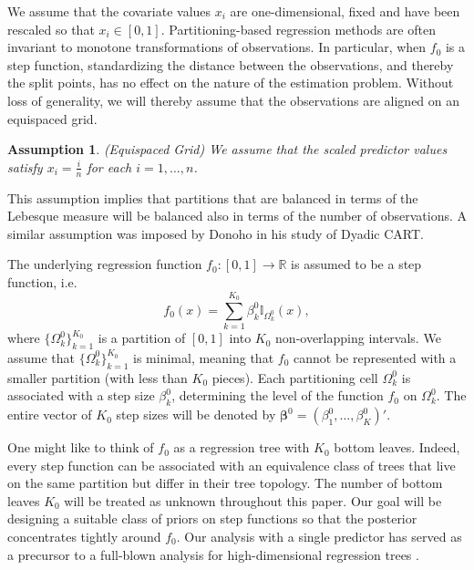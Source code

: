 \documentclass{article}
\newcommand{\1}{\mathbb{I}}
\newcommand{\bm}[1]{\boldsymbol{#1}}
\def\b{\bm{\beta}}
\def\b{\bm{\beta}}
\theoremstyle{assumption}
\newtheorem{assumption}{Assumption}
\begin{document}
We assume that the covariate values $x_i$ are one-dimensional, fixed and have been rescaled so that $x_i\in [0, 1]$. 
Partitioning-based regression methods are often invariant to monotone transformations of  observations. In particular, when $f_0$ is a step function,  standardizing the distance between the observations, and thereby the split points, has no effect on the nature of the estimation problem. Without loss of generality, we will thereby assume that the observations are aligned on an equispaced grid.
\begin{assumption}(Equispaced Grid) \label{ass:fixedgrid}
We assume that the {scaled} predictor values satisfy $x_i = \frac{i}{n}$ for  each $i = 1, \ldots, n$.
\end{assumption}
 This assumption implies that partitions that are balanced in terms of the Lebesque measure  will be balanced also in terms of the number of observations.
 A similar assumption was imposed by Donoho \cite{Donoho1997} in his study of Dyadic CART.


The underlying regression function $f_0: [0, 1] \to \mathbb{R}$ is assumed to be a step function, i.e.
 $$
 f_0(x) = \sum_{k=1}^{K_{0}} \beta_k^0 \1_{\Omega_k^0}(x),
 $$ 
 where $\{\Omega_k^0\}_{k=1}^{K_{0}}$ is a partition of  $[0, 1]$ into $K_0$ non-overlapping intervals. {We assume that $\{\Omega_k^0\}_{k=1}^{K_{0}}$ is minimal, meaning that $f_0$ cannot be represented with a smaller partition (with less than $K_0$ pieces).}
 Each partitioning cell $\Omega_k^0$ is associated with a step size $\beta_k^0$, determining the level of the function $f_0$ on $\Omega_k^0$. The entire vector of $K_0$ step sizes will be denoted by $\b^0=(\beta_1^0,\dots,\beta_K^0)'$.  
 
 
One might like to think of $f_0$ as a regression tree with $K_0$ bottom leaves. Indeed, every step function can be associated with an equivalence class of trees that  live on the same partition but differ in their tree topology. The number of bottom leaves $K_0$ will be treated as unknown throughout this paper.
Our goal will be designing a suitable class of priors on step functions so that the posterior concentrates tightly around $f_0$. Our  analysis  with a single predictor has served as a precursor to a full-blown analysis for high-dimensional regression trees \citep{Rockova2017}.
 
\end{document}
